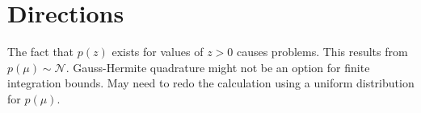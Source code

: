\documentclass{article}         %
\theoremstyle{definition}
\theoremstyle{remark}
\begin{document}
\section{Directions}\label{Directions}

The fact that $p\left(z\right)$ exists for values of $z > 0$ causes problems. This results from $p\left(\mu\right)\sim\mathcal{N}$. Gauss-Hermite quadrature might not be an option for finite integration bounds. May need to redo the calculation using a uniform distribution for $p\left(\mu\right)$.
\end{document}
